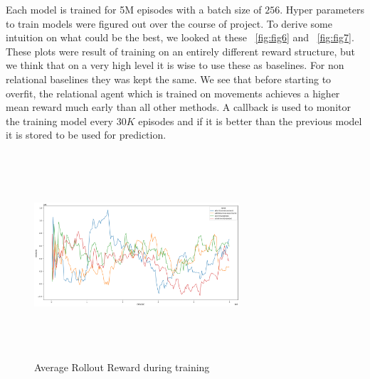 \documentclass[english]{sobraep}
\begin{document}
Each model is trained for 5M episodes with a batch size of $256$. Hyper parameters to train models were figured out over the course of project. To derive some intuition on what could be the best, we looked at these ~\ref{fig:fig6} and ~\ref{fig:fig7}. These plots were result of training on an entirely different reward structure, but we think that on a very high level it is wise to use these as baselines. For non relational baselines they was kept the same. We see that before starting to overfit, the relational agent which is trained on movements achieves a higher mean reward much early than all other methods. A callback is used to monitor the training model every $30K$ episodes and if it is better than the previous model it is stored to be used for prediction.
\begin{figure}
	\includegraphics[width=3in, height=3in]{training.png}
	\centering
	\caption{Average Rollout Reward during training}
	\label{fig:fig4}
\end{figure}
\end{document}
